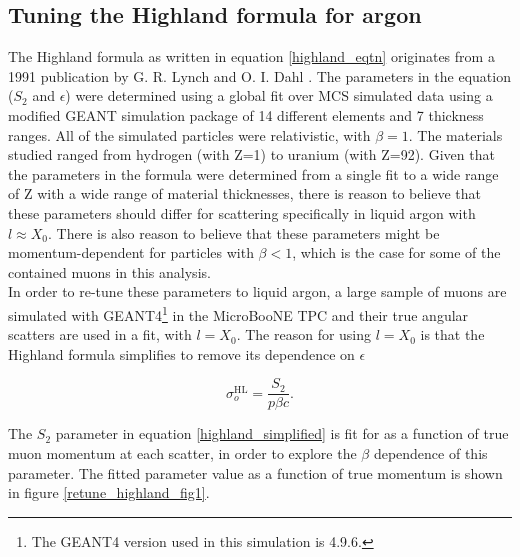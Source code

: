 \documentclass[a4paper,11pt]{article}
\begin{document}
\subsection{Tuning the Highland formula for argon}\label{highland_tuning_section}

The Highland formula as written in equation \ref{highland_eqtn} originates from a 1991 publication by G. R. Lynch and O. I. Dahl \cite{highland-lynch-dahl}. The parameters in the equation ($S_2$ and $\epsilon$) were determined using a global fit over MCS simulated data using a modified GEANT simulation package of 14 different elements and 7 thickness ranges. All of the simulated particles were relativistic, with $\beta=1$. The materials studied ranged from hydrogen (with Z=1) to uranium (with Z=92). Given that the parameters in the formula were determined from a single fit to a wide range of Z with a wide range of material thicknesses, there is reason to believe that these parameters should differ for scattering specifically in liquid argon with $l \approx X_0$. There is also reason to believe that these parameters might be momentum-dependent for particles with $\beta < 1$, which is the case for some of the contained muons in this analysis.\\

In order to re-tune these parameters to liquid argon, a large sample of muons are simulated with GEANT4\footnote{The GEANT4 version used in this simulation is 4.9.6.} \cite{GEANT4_citation} in the MicroBooNE TPC and their true angular scatters are used in a fit, with $l = X_0$. The reason for using $l = X_0$ is that the Highland formula simplifies to remove its dependence on $\epsilon$

\begin{equation}\label{highland_simplified}
	\sigma_o^{\text{HL}}=\frac{S_2}{p\beta c}.
\end{equation}

The $S_2$ parameter in equation \ref{highland_simplified} is fit for as a function of true muon momentum at each scatter, in order to explore the $\beta$ dependence of this parameter. The fitted parameter value as a function of true momentum is shown in figure \ref{retune_highland_fig1}.


\end{document}
